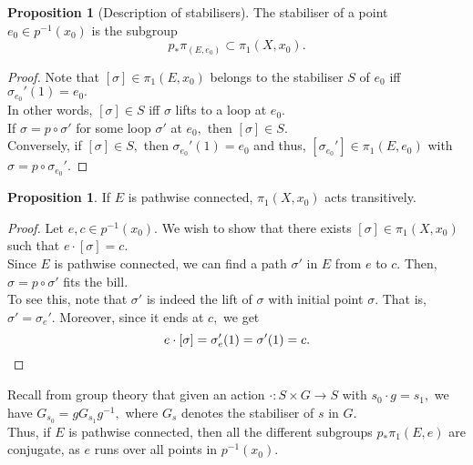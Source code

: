 \documentclass[12pt]{article}
\theoremstyle{definition}
\numberwithin{thm}{section}
\newtheorem{prop}[thm]{Proposition}
\begin{document}
\begin{prop}[Description of stabilisers]
	The stabiliser of a point $e_0 \in p^{-1}(x_0)$ is the subgroup 
	\begin{equation*} 
		p_*\pi_(E, e_0) \subset \pi_1(X, x_0).
	\end{equation*}
\end{prop}
\begin{proof} 
	Note that $[\sigma] \in \pi_1(E, x_0)$ belongs to the stabiliser $S$ of $e_0$ iff $\sigma_{e_0}'(1) = e_0.$\\
	In other words, $[\sigma] \in S$ iff $\sigma$ lifts to a loop at $e_0.$\\
	If $\sigma = p \circ \sigma'$ for some loop $\sigma'$ at $e_0,$ then $[\sigma] \in S.$\\
	Conversely, if $[\sigma] \in S,$ then $\sigma_{e_0}'(1) = e_0$ and thus, $[\sigma_{e_0}'] \in \pi_1(E, e_0)$ with $\sigma = p \circ \sigma_{e_0}'.$
\end{proof}

\begin{prop}
	If $E$ is pathwise connected, $\pi_1(X, x_0)$ acts transitively.
\end{prop}
\begin{proof} 
	Let $e, c \in p^{-1}(x_0).$ We wish to show that there exists $[\sigma] \in \pi_1(X, x_0)$ such that $e\cdot[\sigma] = c.$\\
	Since $E$ is pathwise connected, we can find a path $\sigma'$ in $E$ from $e$ to $c.$ Then, $\sigma = p \circ \sigma'$ fits the bill.\\
	To see this, note that $\sigma'$ is indeed the lift of $\sigma$ with initial point $\sigma.$ That is, $\sigma' = \sigma_e'.$ Moreover, since it ends at $c,$ we get
	\begin{equation*} 
		e\cdot[\sigma] = \sigma_e'(1) = \sigma'(1) = c. \qedhere
	\end{equation*}
\end{proof}

Recall from group theory that given an action $\cdot:S \times G \to S$ with $s_0\cdot g = s_1,$ we have $G_{s_0} = gG_{s_1}g^{-1},$ where $G_s$ denotes the stabiliser of $s$ in $G.$\\
Thus, if $E$ is pathwise connected, then all the different subgroups $p_*\pi_1(E, e)$ are conjugate, as $e$ runs over all points in $p^{-1}(x_0).$
\end{document}
